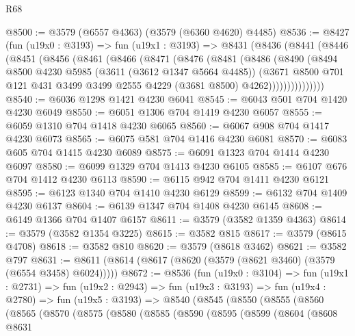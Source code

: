 \begin{lexlean}{R68}
\begin{coremodule}
@8500 := @3579 (@6557 @4363) (@3579 (@6360 @4620) @4485)
@8536 := @8427
    (fun (u19x0 : @3193) =>
    fun (u19x1 : @3193) =>
    @8431
      (@8436
        (@8441
          (@8446
            (@8451
              (@8456
                (@8461
                  (@8466
                    (@8471
                      (@8476
                        (@8481
                          (@8486
                            (@8490
                              (@8494
                                @8500
                                @4230
                                @5985
                                (@3611 (@3612 @1347 @5664 @4485))
                                (@3671
                                  @8500
                                  @701
                                  @121
                                  @431
                                  @3499
                                  @3499
                                  @2555
                                  @4229
                                  (@3681 @8500)
                                  @4262)))))))))))))))
@8540 := @6036 @1298 @1421 @4230 @6041
@8545 := @6043 @501 @704 @1420 @4230 @6049
@8550 := @6051 @1306 @704 @1419 @4230 @6057
@8555 := @6059 @1310 @704 @1418 @4230 @6065
@8560 := @6067 @908 @704 @1417 @4230 @6073
@8565 := @6075 @581 @704 @1416 @4230 @6081
@8570 := @6083 @605 @704 @1415 @4230 @6089
@8575 := @6091 @1323 @704 @1414 @4230 @6097
@8580 := @6099 @1329 @704 @1413 @4230 @6105
@8585 := @6107 @676 @704 @1412 @4230 @6113
@8590 := @6115 @942 @704 @1411 @4230 @6121
@8595 := @6123 @1340 @704 @1410 @4230 @6129
@8599 := @6132 @704 @1409 @4230 @6137
@8604 := @6139 @1347 @704 @1408 @4230 @6145
@8608 := @6149 @1366 @704 @1407 @6157
@8611 := @3579 (@3582 @1359 @4363)
@8614 := @3579 (@3582 @1354 @3225)
@8615 := @3582 @815
@8617 := @3579 (@8615 @4708)
@8618 := @3582 @810
@8620 := @3579 (@8618 @3462)
@8621 := @3582 @797
@8631 := @8611 (@8614 (@8617 (@8620 (@3579 (@8621 @3460) (@3579 (@6554 @3458) @6024)))))
@8672 := @8536
    (fun (u19x0 : @3104) =>
    fun (u19x1 : @2731) =>
    fun (u19x2 : @2943) =>
    fun (u19x3 : @3193) =>
    fun (u19x4 : @2780) =>
    fun (u19x5 : @3193) =>
    @8540
      (@8545
        (@8550
          (@8555
            (@8560
              (@8565
                (@8570
                  (@8575
                    (@8580
                      (@8585
                        (@8590
                          (@8595
                            (@8599
                              (@8604
                                (@8608
                                  @8631

\end{coremodule}
\end{lexlean}
